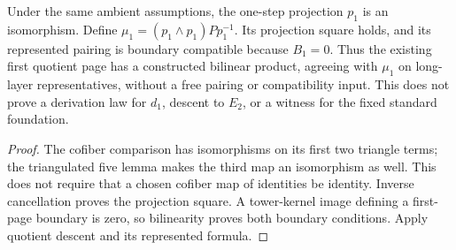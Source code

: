 \begin{proposition}
  \label{prop:h6-sphere-pairing-one}
  \leanok
  Under the same ambient assumptions, the one-step projection $p_1$ is
  an isomorphism. Define $\mu_1=(p_1\wedge p_1)Pp_1^{-1}$. Its projection
  square holds, and its represented pairing is boundary compatible because
  $B_1=0$. Thus the existing first quotient page has a constructed bilinear
  product, agreeing with $\mu_1$ on long-layer representatives, without a
  free pairing or compatibility input. This does not prove a derivation law
  for $d_1$, descent to $E_2$, or a witness for the fixed standard foundation.
\end{proposition}
\begin{proof}
  The cofiber comparison has isomorphisms on its first two triangle terms;
  the triangulated five lemma makes the third map an isomorphism as well.
  This does not require that a chosen cofiber map of identities be identity.
  Inverse cancellation proves the projection square. A tower-kernel image
  defining a first-page boundary is zero, so bilinearity proves both boundary
  conditions. Apply quotient descent and its represented formula.
  \leanok
\end{proof}

